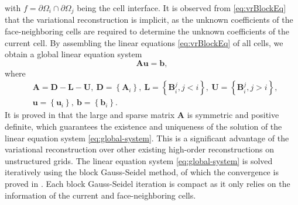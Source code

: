 with $f= \partial \Omega_i \cap \partial \Omega_j$ being the cell interface.
It is observed from \eqref{eq:vrBlockEq} that the variational reconstruction is implicit, as the unknown coefficients of the face-neighboring cells are required to determine the unknown coefficients of the current cell.
By assembling the linear equations \eqref{eq:vrBlockEq} of all cells, we obtain a global linear equation system
\begin{equation}
    \label{eq:global-system}
    \mathbf{A} \mathbf{u} = \mathbf{b},
\end{equation}
where
\begin{equation}
    \begin{aligned}
         & \mathbf{A}= \mathbf{D} -  \mathbf{L} -  \mathbf{U},
        \ \mathbf{D}= \left\{\mathbf{A}_i\right\},
        \ \mathbf{L}= \left\{\mathbf{B}^j_i, j<i\right\},
        \ \mathbf{U}= \left\{\mathbf{B}^j_i, j>i\right\},
        \\
         & \mathbf{u}= \left\{\mathbf{u}_i\right\}, \ \mathbf{b}= \left\{\mathbf{b}_i\right\}.
    \end{aligned}
\end{equation}
It is proved in \cite{wang2017compact_VR} that the large and sparse matrix $\mathbf{A}$ is symmetric and positive definite, which guarantees the existence and uniqueness of the solution of the linear equation system \eqref{eq:global-system}. This is a significant advantage of the variational reconstruction over other existing high-order reconstructions on unstructured grids.
The linear equation system \eqref{eq:global-system} is solved iteratively using the block Gauss-Seidel method, of which the convergence is proved in \cite{wang2017compact_VR}.
Each block Gauss-Seidel iteration is compact as it only relies on the information of the current and face-neighboring cells.

